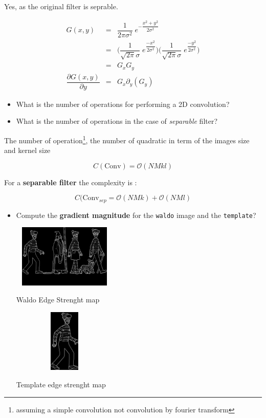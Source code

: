 \documentclass[a4paper]{tufte-handout}
\begin{document}
Yes, as the original filter is seprable.

\begin{eqnarray}
  G(x,y) &  = & \dfrac{1}{2\pi \sigma^2}\; e^{-\dfrac{x^2 + y^2}{2\sigma^2}}\\
         &  = & \big(\dfrac{1}{\sqrt{2\pi} \sigma}\;e^{\dfrac{-x^2}{2\sigma^2}}\big)
\big(\dfrac{1}{\sqrt{2\pi} \sigma}\;e^{\dfrac{-y^2}{2\sigma^2}}\big)\\
        &   = & G_x G_y\\
  \dfrac{\partial G(x,y)}{\partial y} & =  & G_x \partial_y(G_y) 
\end{eqnarray}
\begin{itemize}
  \item What is the number of operations for performing a 2D convolution?
  \item What is the number of operations in the case of \emph{separable} filter?
\end{itemize}

The number of operation\footnote{assuming a simple convolution not convolution
by fourier transform}, the number of quadratic in term of the images size and
kernel size

\begin{equation}
  C(\text{Conv}) = \mathcal{O}(NMkl)
\end{equation}

For a \textbf{separable filter} the complexity is :

\begin{equation}
  C(\text{Conv}_{sep}  = \mathcal{O}(NMk) + \mathcal{O}(NMl)
\end{equation}
\begin{itemize}
  \item Compute the \textbf{gradient magnitude} for the \texttt{waldo} image and
    the \texttt{template}?
\begin{marginfigure}
  \centering
  \includegraphics[width=5cm, height=3cm]{./waldo_ESM.png}
  \caption{Waldo Edge Strenght map}
\end{marginfigure}

\begin{marginfigure}
  \centering
  \includegraphics[width=5cm, height=3cm]{./template_ESM.png}
  \caption{Template edge strenght map}
\end{marginfigure}
\end{itemize}
\end{document}

